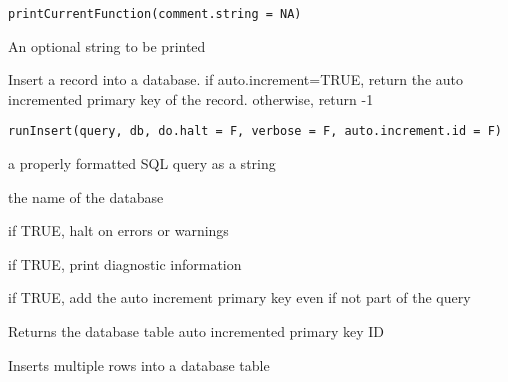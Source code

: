 \documentclass[letterpaper]{book}
\begin{document}
%
\begin{Usage}
\begin{verbatim}
printCurrentFunction(comment.string = NA)
\end{verbatim}
\end{Usage}
%
\begin{Arguments}
\begin{ldescription}
\item[\code{comment.string}] An optional string to be printed
\end{ldescription}
\end{Arguments}
%
\begin{Description}\relax
Insert a record into a database. if auto.increment=TRUE, return the auto incremented
primary key of the record. otherwise, return -1
\end{Description}
%
\begin{Usage}
\begin{verbatim}
runInsert(query, db, do.halt = F, verbose = F, auto.increment.id = F)
\end{verbatim}
\end{Usage}
%
\begin{Arguments}
\begin{ldescription}
\item[\code{query}] a properly formatted SQL query as a string

\item[\code{db}] the name of the database

\item[\code{do.halt}] if TRUE, halt on errors or warnings

\item[\code{verbose}] if TRUE, print diagnostic information

\item[\code{auto.increment}] if TRUE, add the auto increment primary key even if not part of the query
\end{ldescription}
\end{Arguments}
%
\begin{Value}
Returns the database table auto incremented primary key ID
\end{Value}
%
\begin{Description}\relax
Inserts multiple rows into a database table
\end{Description}
\end{document}
